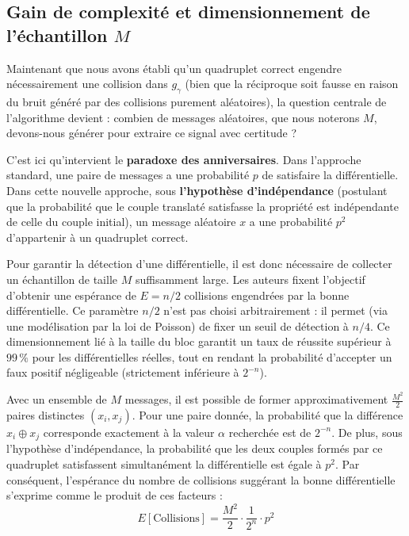 \documentclass[a4paper,11pt]{article}
\begin{document}
\subsection{Gain de complexité et dimensionnement de l'échantillon $M$}

Maintenant que nous avons établi qu'un quadruplet correct engendre nécessairement une collision dans $g_{\gamma}$ (bien que la réciproque soit fausse en raison du bruit généré par des collisions purement aléatoires), la question centrale de l'algorithme devient : combien de messages aléatoires, que nous noterons $M$, devons-nous générer pour extraire ce signal avec certitude ?

C'est ici qu'intervient le \textbf{paradoxe des anniversaires}. Dans l'approche standard, une paire de messages a une probabilité $p$ de satisfaire la différentielle. Dans cette nouvelle approche, sous \textbf{l'hypothèse d'indépendance} (postulant que la probabilité que le couple translaté satisfasse la propriété est indépendante de celle du couple initial), un message aléatoire $x$ a une probabilité $p^2$ d'appartenir à un quadruplet correct.

Pour garantir la détection d'une différentielle, il est donc nécessaire de collecter un échantillon de taille $M$ suffisamment large. Les auteurs fixent l'objectif d'obtenir une espérance de $E = n/2$ collisions engendrées par la bonne différentielle. Ce paramètre $n/2$ n'est pas choisi arbitrairement : il permet (via une modélisation par la loi de Poisson) de fixer un seuil de détection à $n/4$. Ce dimensionnement lié à la taille du bloc garantit un taux de réussite supérieur à $99\,\%$ pour les différentielles réelles, tout en rendant la probabilité d'accepter un faux positif négligeable (strictement inférieure à $2^{-n}$).

Avec un ensemble de $M$ messages, il est possible de former approximativement $\frac{M^2}{2}$ paires distinctes $(x_i, x_j)$. Pour une paire donnée, la probabilité que la différence $x_i \oplus x_j$ corresponde exactement à la valeur $\alpha$ recherchée est de $2^{-n}$. De plus, sous l'hypothèse d'indépendance, la probabilité que les deux couples formés par ce quadruplet satisfassent simultanément la différentielle est égale à $p^2$. Par conséquent, l'espérance du nombre de collisions suggérant la bonne différentielle s'exprime comme le produit de ces facteurs :
\begin{equation*}
    E[\text{Collisions}] = \frac{M^2}{2} \cdot \frac{1}{2^n} \cdot p^2
\end{equation*}
\end{document}
